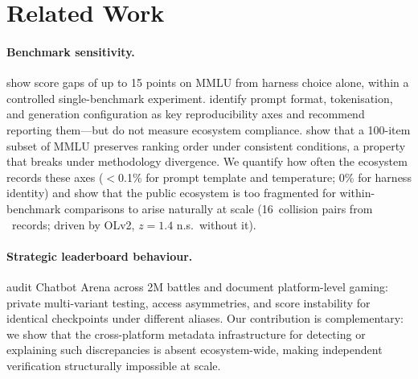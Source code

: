 \documentclass[11pt]{article}
\begin{document}
\section{Related Work}\label{sec:related}

\paragraph{Benchmark sensitivity.}
\citet{alzahrani-2024-benchmarks} show score gaps of up to 15 points
on MMLU from harness choice alone, within a controlled
single-benchmark experiment. \citet{biderman-2024-lessons} identify
prompt format, tokenisation, and generation configuration as key
reproducibility axes and recommend reporting them---but do not
measure ecosystem compliance.
\citet{polo-2024-tinybenchmarks} show that a 100-item subset of
MMLU preserves ranking order under consistent conditions, a
property that breaks under methodology divergence. We quantify how
often the ecosystem records these axes
($<$0.1\% for prompt template and temperature; 0\% for harness
identity) and show that the
public ecosystem is too fragmented for within-benchmark comparisons
to arise naturally at scale (16~collision pairs from
\totalrecords{}~records; driven by OLv2, $z=1.4$ n.s.\ without it).

\paragraph{Strategic leaderboard behaviour.}
\citet{singh-2025-illusion} audit Chatbot Arena across 2M battles
and document platform-level gaming: private multi-variant testing,
access asymmetries, and score instability for identical checkpoints
under different aliases. Our contribution is complementary: we show
that the cross-platform metadata infrastructure for detecting or
explaining such discrepancies is absent ecosystem-wide, making
independent verification structurally impossible at scale.
\end{document}
